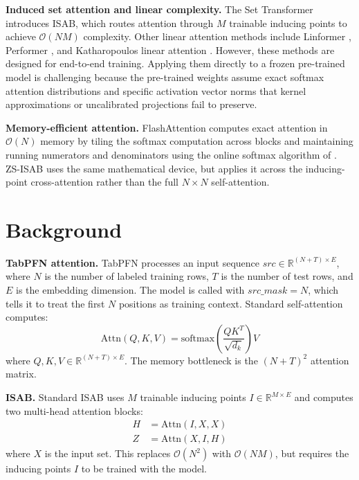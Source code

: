 \documentclass{article}
\begin{document}
\textbf{Induced set attention and linear complexity.}
The Set Transformer \citep{lee2019set} introduces ISAB, which routes attention through $M$ trainable inducing points to achieve $\mathcal{O}(NM)$ complexity. Other linear attention methods include Linformer \citep{wang2020linformer}, Performer \citep{choromanski2020rethinking}, and Katharopoulos linear attention \citep{katharopoulos2020transformers}. However, these methods are designed for end-to-end training. Applying them directly to a frozen pre-trained model is challenging because the pre-trained weights assume exact softmax attention distributions and specific activation vector norms that kernel approximations or uncalibrated projections fail to preserve.

\textbf{Memory-efficient attention.}
FlashAttention \citep{dao2022flashattention} computes exact attention in $\mathcal{O}(N)$ memory by tiling the softmax computation across blocks and maintaining running numerators and denominators using the online softmax algorithm of \citet{milakov2018online}. ZS-ISAB uses the same mathematical device, but applies it across the inducing-point cross-attention rather than the full $N \times N$ self-attention.

\section{Background}

\textbf{TabPFN attention.}
TabPFN processes an input sequence $src \in \mathbb{R}^{(N+T) \times E}$, where $N$ is the number of labeled training rows, $T$ is the number of test rows, and $E$ is the embedding dimension. The model is called with $src\_mask = N$, which tells it to treat the first $N$ positions as training context. Standard self-attention computes:
\begin{equation}
    \text{Attn}(Q, K, V) = \text{softmax}\!\left(\frac{QK^T}{\sqrt{d_k}}\right)V
\end{equation}
where $Q, K, V \in \mathbb{R}^{(N+T) \times E}$. The memory bottleneck is the $(N+T)^2$ attention matrix.

\textbf{ISAB.}
Standard ISAB \citep{lee2019set} uses $M$ trainable inducing points $I \in \mathbb{R}^{M \times E}$ and computes two multi-head attention blocks:
\begin{align}
    H &= \text{Attn}(I, X, X) \\
    Z &= \text{Attn}(X, I, H)
\end{align}
where $X$ is the input set. This replaces $\mathcal{O}(N^2)$ with $\mathcal{O}(NM)$, but requires the inducing points $I$ to be trained with the model.
\end{document}
